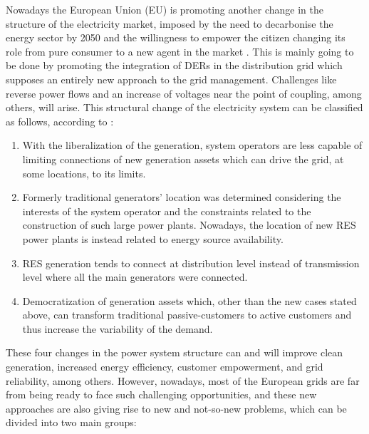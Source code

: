 Nowadays the European Union (EU) is promoting another change in the structure of the electricity market, imposed by the need to decarbonise the energy sector by 2050 and the willingness to empower the citizen changing its role from pure consumer to a new agent in the market \cite{Hancher2017}. This is mainly going to be done by promoting the integration of DERs in the distribution grid which supposes an entirely new approach to the grid management. Challenges like reverse power flows and an increase of voltages near the point of coupling, among others, will arise. This structural change of the electricity system can be classified as follows, according to \cite{Bollen2011}:

\begin{enumerate}
\item With the liberalization of the generation, system operators are less capable of limiting
connections of new generation assets which can drive the grid, at some locations, to its
limits.
\item Formerly traditional generators' location was determined considering the interests of the system
operator and the constraints related to the construction of such large power plants.
Nowadays, the location of new RES power plants is instead related to energy source availability.
\item RES generation tends to connect at distribution level instead of transmission level where
all the main generators were connected.
\item Democratization of generation assets which, other than the new cases stated above, can
transform traditional passive-customers to active customers and thus increase the variability
of the demand.

\end{enumerate}

These four changes in the power system structure can and will improve clean generation, increased energy efficiency, customer empowerment, and grid reliability, among others. However,  nowadays, most of the European grids are far from being ready to face such challenging opportunities, and these new approaches are also giving rise to new and not-so-new problems, which can be divided into two main groups: 

